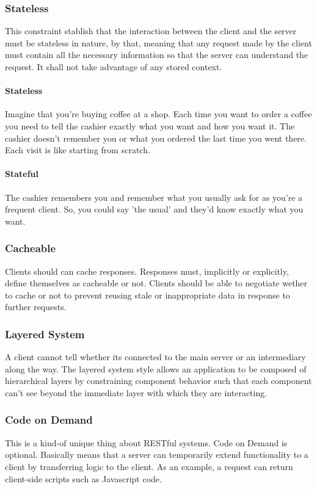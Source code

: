 \documentclass[a4paper]{article}
\begin{document}
    \subsubsection{Stateless} This constraint stablish that the interaction between the client and the server must be stateless in nature, by that, meaning that any request made by the client must contain all the necessary information so that the server can understand the request. It shall not take advantage of any stored context. 
    
    \paragraph{Stateless} Imagine that you're buying coffee at a shop. Each time you want to order a coffee you need to tell the cashier exactly what you want and how you want it. The cashier doesn't remember you or what you ordered the last time you went there. Each visit is like starting from scratch. 

    \paragraph{Stateful} The cashier remembers you and remember what you usually ask for as you're a frequent client. So, you could say 'the usual' and they'd know exactly what you want.

    \subsubsection{Cacheable} Clients should can cache responses. Responses must, implicitly or explicitly, define themselves as cacheable or not. Clients should be able to negotiate wether to cache or not to prevent reusing stale or inappropriate data in response to further requests.


    \subsubsection{Layered System} A client cannot tell whether its connected to the main server or an intermediary along the way. The layered system style allows an application to be composed of hierarchical layers by constraining component behavior such that each component can't see beyond the immediate layer with which they are interacting.

    \subsubsection{Code on Demand} This is a kind-of unique thing about RESTful systems. Code on Demand is optional. Basically means that a server can temporarily extend functionality to a client by transferring logic to the client. As an example, a request can return client-side scripts such as Javascript code.
\end{document}
